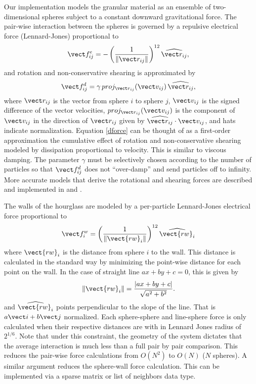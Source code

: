 \documentclass[12pt]{amsart}
\begin{document}
Our implementation models the granular material as an ensemble of two-dimensional spheres subject to a constant downward gravitational force. The pair-wise interaction between the spheres is governed by a repulsive electrical force (Lennard-Jones) proportional to
\begin{equation}
  \vect f^{e}_{ij} = -\left(\frac{1}{\|\vect r_{ij}\|}\right)^{12}\widehat{\vect r_{ij}},
  \label{ljforce}
\end{equation}
and rotation and non-conservative shearing is approximated by
\begin{equation}
  \vect f^{d}_{ij} = \gamma\, proj_{\vect r_{ij}}(\vect v_{ij}) \, \widehat{\vect r_{ij}}, 
  \label{dforce}
\end{equation}
where $\vect r_{ij}$ is the vector from sphere $i$ to sphere $j$, $\vect
v_{ij}$ is the signed difference of the vector velocities,  $proj_{\vect
r_{ij}}(\vect v_{ij})$ is the component of $\vect v_{ij}$ in the direction of
$\vect r_{ij}$ given by $\widehat{\vect r_{ij}} \cdot \vect v_{ij}$, and hats
indicate normalization. Equation \eqref{dforce} can be thought of as a
first-order approximation the cumulative effect of rotation and
non-conservative shearing modeled by dissipation proportional to velocity.
This is similar to viscous damping.  The parameter $\gamma$ must be selectively
chosen according to the number of particles so that $\vect f^{d}_{ij}$ does not
``over-damp'' and send particles off to infinity.  More accurate models that
derive the rotational and shearing forces are described and implemented in
\cite{cundle} and \cite{bell}.

The walls of the hourglass are modeled by a per-particle Lennard-Jones
electrical force proportional to 
\begin{equation}
  \vect f^w_i = \left(\frac{1}{\|\vect {rw}_{i}\|}\right)^{12}\widehat{ \vect {rw}_i }
\label{wforce}
\end{equation}
where $\vect{rw}_{i}$ is the distance from sphere $i$ to the wall. This
distance is calculated in the standard way by minimizing the point-wise
distance for each point on the wall.  In the case of straight line $ax + by +
c=0$, this is given by 
$$
  \|\vect{rw}_i \| = \frac{|ax + by +c|}{\sqrt{a^2 + b^2}}.
$$
and $\widehat{\vect{rw}_i}$ points perpendicular to the slope of the line.
That is $a\vect i + b\vect j$ normalized.  Each sphere-sphere and line-sphere
force is only calculated when their respective distances are with in Lennard
Jones radius of $2^{1/6}$.  Note that under this constraint, the geometry of
the system dictates that the average interaction is much less than a full pair
by pair comparison.  This reduces the pair-wise force calculations from
$O\left(N^2\right)$ to $O(N)$ ($N$ spheres).  A similar argument reduces 
the sphere-wall force calculation.  This can be implemented via a sparse
matrix or list of neighbors data type.
\end{document}
